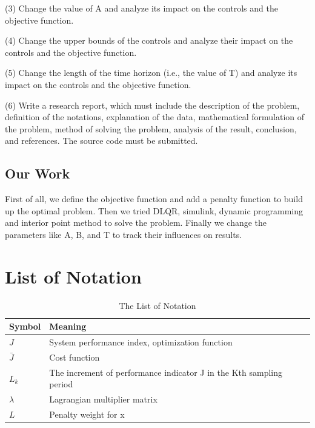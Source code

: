 \documentclass{mcmthesis}
\begin{document}
(3)	Change the value of A and analyze its impact on the controls and the objective function.

(4)	Change the upper bounds of the controls and analyze their impact on the controls and the objective function.

(5)	Change the length of the time horizon (i.e., the value of T) and analyze its impact on the controls and the objective function.

(6)	Write a research report, which must include the description of the problem, definition of the notations, explanation of the data, mathematical formulation of the problem, method of solving the problem, analysis of the result, conclusion, and references. The source code must be submitted.


\subsection{Our Work}
First of all, we define the objective function and add a penalty function to build up the optimal problem. Then we tried DLQR, simulink, dynamic programming and interior point method to solve the problem. Finally we change the parameters like A, B, and T to track their influences on results.


\section{List of Notation}

\begin{center}
\begin{longtable}{p{}p{}m{}}
\caption{The List of Notation}\\
\hline
Symbol& Meaning \\
\hline

$J$      & System performance index, optimization function
                                                         \\
$\bar J$ & Cost function    \\
$L_k$      & The increment of performance indicator J in the Kth sampling period
                                                          \\
$\lambda$     & Lagrangian multiplier matrix\\
$L$     & Penalty weight for x
                                                                                        \\ \hline

 \end{longtable}
 \end{center}
\end{document}
